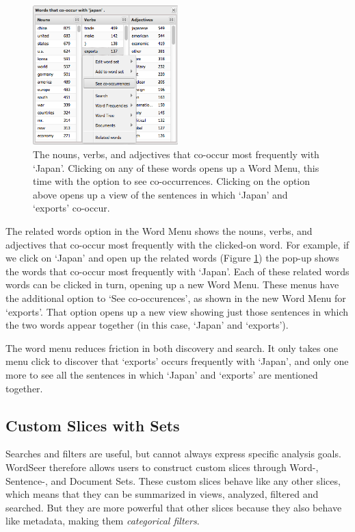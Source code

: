 \documentclass{sig-alternate}
\begin{document}
\begin{figure}[ht!]
\begin{center}
	\includegraphics[width=0.5\textwidth]{fig/intro/09.png}
\end{center}
    \caption{%
 		The nouns, verbs, and adjectives that co-occur most frequently with `Japan'. Clicking on any of these words opens up a Word Menu, this time with the option to see co-occurrences.  Clicking on the option  above opens up a view of the sentences in which `Japan' and `exports'  co-occur.
	\label{fig:intro09}}%
\end{figure}


The related words option in the Word Menu shows the nouns, verbs, and adjectives that co-occur most frequently with the clicked-on word. For example, if we click on `Japan' and open up the related words (Figure \ref{fig:intro09}) the pop-up shows the words that co-occur most frequently with `Japan'. Each of these related words words can be clicked in turn, opening up a new Word Menu. These menus have the additional option to `See co-occurences', as shown in the new Word Menu for `exports'. That option opens up a new view showing just those sentences in which the two words appear together  (in this case, `Japan' and `exports'). 

The word menu reduces friction in both discovery and search. It only takes one menu click to discover that `exports' occurs frequently with `Japan', and only one more to see all the sentences in which `Japan' and `exports' are mentioned together.  


\subsection{Custom Slices with Sets}

Searches and filters are useful, but cannot always express  specific analysis goals. WordSeer therefore allows users to construct custom slices through Word-, Sentence-, and Document Sets. These custom slices behave like any other slices, which means that they can be summarized in views,  analyzed, filtered and searched. But they are more powerful that other slices because they also behave like metadata, making them \emph{categorical filters}.
\end{document}
